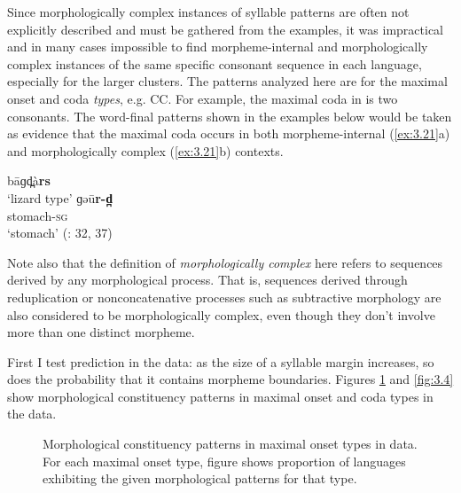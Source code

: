   Since morphologically complex instances of syllable patterns are often not explicitly described and must be gathered from the examples, it was impractical and in many cases impossible to find morpheme-internal and morphologically complex instances of the same specific consonant sequence in each language, especially for the larger clusters. The patterns analyzed here are for the maximal onset and coda \textit{types}, e.g. CC. For example, the maximal coda in  is two consonants. The word-final patterns shown in the examples below would be taken as evidence that the maximal coda occurs in both morpheme-internal (\ref{ex:3.21}a) and morphologically complex (\ref{ex:3.21}b) contexts.

\ea\label{ex:3.21}

\ea  bāɡd̪à\textbf{rs}\\
\glt ‘lizard type’
\ex  ɡəū\textbf{r-d̪}\\
stomach-\textsc{sg}\\
\glt ‘stomach’
(\citealt{Stirtz2011}: 32, 37)
\z
\z

  Note also that the definition of \textit{morphologically complex} here refers to sequences derived by any morphological process. That is, sequences derived through reduplication or nonconcatenative processes such as subtractive morphology are also considered to be morphologically complex, even though they don’t involve more than one distinct morpheme.

  First I test  prediction in the data: as the size of a syllable margin increases, so does the probability that it contains morpheme boundaries. Figures \ref{fig:3.3} and \ref{fig:3.4} show morphological constituency patterns in maximal onset and coda types in the data.

  
\begin{figure}
\caption{\label{fig:3.3}Morphological constituency patterns in maximal onset types in data. For each maximal onset type, figure shows proportion of languages exhibiting the given morphological patterns for that type.}
\end{figure}


